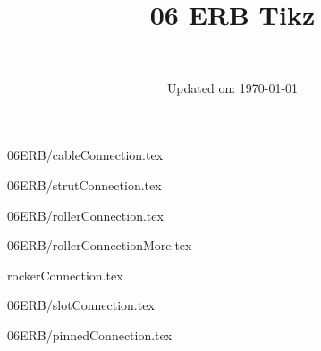 \documentclass[9pt, xcolor={svgnames, x11names},professionalfonts]{beamer}
\title[06ERB Tikz]{\Huge 06 ERB Tikz}
\subtitle[Engineering Statics]{\Large\textcolor{white}{Engineering Statics}}
\author{}
\date{\small Updated on: \today}
\def\scale{1}
\begin{document}

\begin{frame}[plain]    %
	\titlepage
\end{frame}



\begin{frame}{06ERB/cableConnection.tex}
	\def\scale{0.5}
	
\end{frame}

\begin{frame}{06ERB/strutConnection.tex}
	\def\scale{0.5}
	
\end{frame}

\begin{frame}{06ERB/rollerConnection.tex}
	\def\scale{0.45}
	
\end{frame}

\begin{frame}{06ERB/rollerConnectionMore.tex}
	\def\scale{0.35}	
	
\end{frame}

\begin{frame}{rockerConnection.tex}
	\def\scale{0.35}
	
\end{frame}

\begin{frame}{06ERB/slotConnection.tex}
	\def\scale{0.45}
		
\end{frame}

\begin{frame}{06ERB/pinnedConnection.tex}
	\def\scale{0.45}
		
\end{frame}
\end{document}
